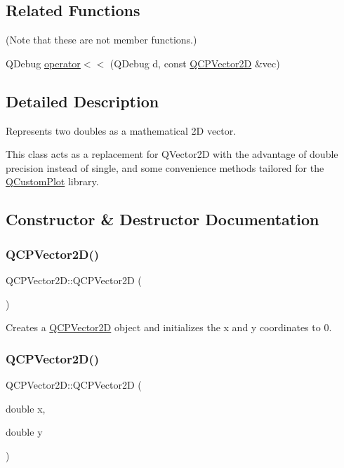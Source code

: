 \subsection*{Related Functions}
(Note that these are not member functions.) \begin{DoxyCompactItemize}
\item 
Q\+Debug \mbox{\hyperlink{class_q_c_p_vector2_d_a6c757af9671d925af4a36c2f58fb7234}{operator$<$$<$}} (Q\+Debug d, const \mbox{\hyperlink{class_q_c_p_vector2_d}{Q\+C\+P\+Vector2D}} \&vec)
\end{DoxyCompactItemize}


\subsection{Detailed Description}
Represents two doubles as a mathematical 2D vector. 

This class acts as a replacement for Q\+Vector2D with the advantage of double precision instead of single, and some convenience methods tailored for the \mbox{\hyperlink{class_q_custom_plot}{Q\+Custom\+Plot}} library. 

\subsection{Constructor \& Destructor Documentation}
\mbox{\label{class_q_c_p_vector2_d_a04c90748c3623044c79fa20788ffbcc6}} 
\subsubsection{\texorpdfstring{QCPVector2D()}{QCPVector2D()}\hspace{0.1cm}{\footnotesize\ttfamily [1/4]}}
{\footnotesize\ttfamily Q\+C\+P\+Vector2\+D\+::\+Q\+C\+P\+Vector2D (\begin{DoxyParamCaption}{ }\end{DoxyParamCaption})}

Creates a \mbox{\hyperlink{class_q_c_p_vector2_d}{Q\+C\+P\+Vector2D}} object and initializes the x and y coordinates to 0. \mbox{\label{class_q_c_p_vector2_d_a47bd86cebc5588dad6ec84349d9098d4}} 
\subsubsection{\texorpdfstring{QCPVector2D()}{QCPVector2D()}\hspace{0.1cm}{\footnotesize\ttfamily [2/4]}}
{\footnotesize\ttfamily Q\+C\+P\+Vector2\+D\+::\+Q\+C\+P\+Vector2D (\begin{DoxyParamCaption}\item[{double}]{x,  }\item[{double}]{y }\end{DoxyParamCaption})}

